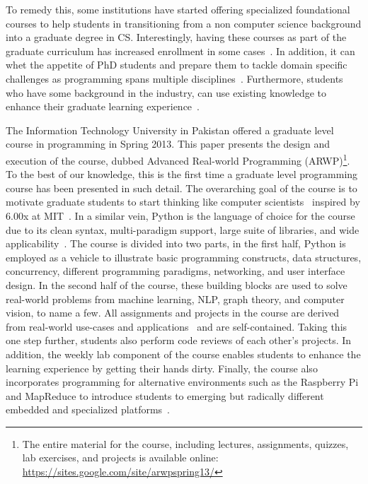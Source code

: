 \documentclass[letterpaper,twocolumn,10pt]{article}
\begin{document}
To remedy this, some institutions have started offering specialized foundational
courses to help students in transitioning from a non computer science background
into a graduate degree in CS. Interestingly, having these courses as part of the
graduate curriculum has increased enrollment in some
cases~\cite{Kongmunvattana:2012:AFC}. In addition, it can whet the appetite of
PhD students and prepare them to tackle domain specific challenges as
programming spans multiple disciplines~\cite{Arden:1969:RPP}. Furthermore,
students who have some background in the industry, can use existing knowledge to
enhance their graduate learning experience~\cite{Iyengar:1978:ECP}.

The Information Technology University in Pakistan offered a graduate level
course in programming in Spring 2013. This paper presents the design and
execution of the course, dubbed Advanced Real-world Programming
(ARWP)\footnote{The entire material for the course, including lectures,
assignments, quizzes, lab exercises, and projects is available online:
\url{https://sites.google.com/site/arwpspring13/}}. To the best of our
knowledge, this is the first time a graduate level programming course has been
presented in such detail. The overarching goal of the course is to motivate
graduate students to start thinking like computer scientists~\cite{elkner:think}
inspired by 6.00x at MIT~\cite{6.00x}. In a similar vein, Python is the language
of choice for the course due to its clean syntax, multi-paradigm support, large
suite of libraries, and wide
applicability~\cite{Davies:2011:SCP,Dodds:2008:EBC,Blank:2003:PPV}. The course
is divided into two parts, in the first half, Python is employed as a vehicle to
illustrate basic programming constructs, data structures, concurrency, different
programming paradigms, networking, and user interface design. In the second half
of the course, these building blocks are used to solve real-world problems from
machine learning, NLP, graph theory, and computer vision, to name a few. All
assignments and projects in the course are derived from real-world use-cases and
applications~\cite{Stevenson:2006:DRP} and are self-contained. Taking this one
step further, students also perform code reviews of each other's projects. In
addition, the weekly lab component of the course enables students to enhance the
learning experience by getting their hands dirty. Finally, the course also
incorporates programming for alternative environments such as the Raspberry Pi
and MapReduce to introduce students to emerging but radically different embedded
and specialized platforms~\cite{Nutt:2006:ASC}.
\end{document}

